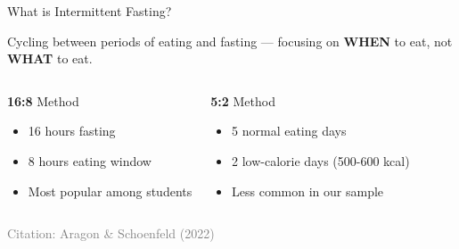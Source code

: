 \documentclass[aspectratio=169, 12pt]{beamer}
\begin{document}
\begin{frame}{What is Intermittent Fasting?}
  \begin{definition}
    Cycling between periods of eating and fasting — focusing on \textbf{WHEN} to eat, not \textbf{WHAT} to eat.
  \end{definition}
  
  \vspace{0.5cm}
  \begin{columns}[T]
    \begin{block}{\textbf{16:8} Method}
      \begin{itemize}
        \item 16 hours fasting
        \item 8 hours eating window
        \item Most popular among students
      \end{itemize}
    \end{block}
    
    \begin{block}{\textbf{5:2} Method}
      \begin{itemize}
        \item 5 normal eating days
        \item 2 low-calorie days (500-600 kcal)
        \item Less common in our sample
      \end{itemize}
    \end{block}
  \end{columns}
  
  \vspace{0.3cm}
  \tiny \textcolor{gray}{Citation: Aragon \& Schoenfeld (2022)}
\end{frame}
\end{document}
